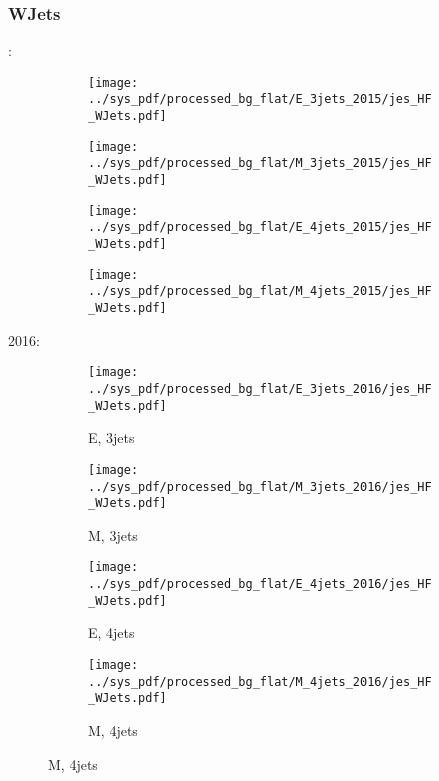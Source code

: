 \documentclass{beamer}
\begin{document}
\begin{frame}
\frametitle{WJets}
\fontsize{5}{1}:
\begin{figure}
\centering
\begin{subfigure}[b]{0.24\textwidth}
\texttt{[image: ../sys\_pdf/processed\_bg\_flat/E\_3jets\_2015/jes\_HF\_WJets.pdf]}
\end{subfigure}
\begin{subfigure}[b]{0.24\textwidth}
\texttt{[image: ../sys\_pdf/processed\_bg\_flat/M\_3jets\_2015/jes\_HF\_WJets.pdf]}
\end{subfigure}
\begin{subfigure}[b]{0.24\textwidth}
\texttt{[image: ../sys\_pdf/processed\_bg\_flat/E\_4jets\_2015/jes\_HF\_WJets.pdf]}
\end{subfigure}
\begin{subfigure}[b]{0.24\textwidth}
\texttt{[image: ../sys\_pdf/processed\_bg\_flat/M\_4jets\_2015/jes\_HF\_WJets.pdf]}
\end{subfigure}
\end{figure}
2016:
\begin{figure}
\centering
\begin{subfigure}[b]{0.24\textwidth}
\texttt{[image: ../sys\_pdf/processed\_bg\_flat/E\_3jets\_2016/jes\_HF\_WJets.pdf]}
\captionsetup{font=tiny}
\caption{E, 3jets}
\end{subfigure}
\begin{subfigure}[b]{0.24\textwidth}
\texttt{[image: ../sys\_pdf/processed\_bg\_flat/M\_3jets\_2016/jes\_HF\_WJets.pdf]}
\captionsetup{font=tiny}
\caption{M, 3jets}
\end{subfigure}
\begin{subfigure}[b]{0.24\textwidth}
\texttt{[image: ../sys\_pdf/processed\_bg\_flat/E\_4jets\_2016/jes\_HF\_WJets.pdf]}
\captionsetup{font=tiny}
\caption{E, 4jets}
\end{subfigure}
\begin{subfigure}[b]{0.24\textwidth}
\texttt{[image: ../sys\_pdf/processed\_bg\_flat/M\_4jets\_2016/jes\_HF\_WJets.pdf]}
\captionsetup{font=tiny}
\caption{M, 4jets}
\end{subfigure}
\end{figure}
\end{frame}
\end{document}
